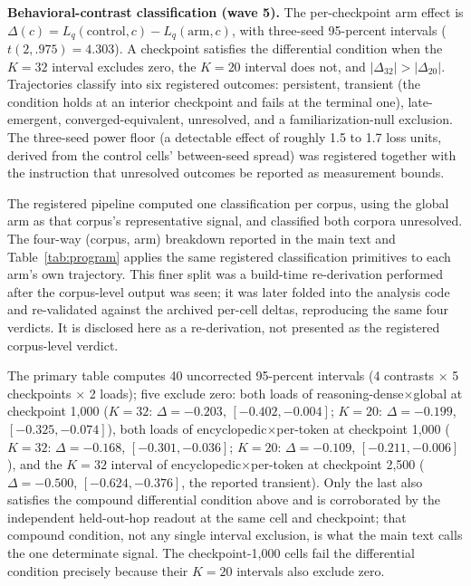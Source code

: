 \documentclass{article} %
\begin{document}
\textbf{Behavioral-contrast classification (wave 5).} The per-checkpoint
arm effect is $\Delta(c) = L_q(\text{control}, c) - L_q(\text{arm}, c)$,
with three-seed 95-percent intervals ($t(2, .975) = 4.303$). %
A checkpoint
satisfies the differential condition when the $K{=}32$ interval excludes
zero, the $K{=}20$ interval does not, and $|\Delta_{32}| > |\Delta_{20}|$.
Trajectories classify into six registered outcomes: persistent, transient
(the condition holds at an interior checkpoint and fails at the terminal
one), late-emergent, converged-equivalent, unresolved, and a
familiarization-null exclusion. The three-seed power floor (a detectable
effect of roughly 1.5 to 1.7 loss units, derived from the control cells'
between-seed spread) was registered together with the instruction that
unresolved outcomes be reported as measurement bounds. %

The registered pipeline computed one classification per corpus, using the
global arm as that corpus's representative signal, and classified both
corpora unresolved. %
The four-way (corpus, arm) breakdown reported in the
main text and Table~\ref{tab:program} applies the same registered
classification primitives to each arm's own trajectory. This finer split
was a build-time re-derivation performed after the corpus-level output was
seen; it was later folded into the analysis code and re-validated against
the archived per-cell deltas, reproducing the same four verdicts. It is
disclosed here as a re-derivation, not presented as the registered
corpus-level verdict.

The primary table computes 40 uncorrected 95-percent intervals (4
contrasts $\times$ 5 checkpoints $\times$ 2 loads); five exclude zero:
both loads of reasoning-dense$\times$global at checkpoint 1{,}000
($K{=}32$: $\Delta{=}{-}0.203$, $[-0.402,-0.004]$; $K{=}20$:
$\Delta{=}{-}0.199$, $[-0.325,-0.074]$), both loads of
encyclopedic$\times$per-token at checkpoint 1{,}000 ($K{=}32$:
$\Delta{=}{-}0.168$, $[-0.301,-0.036]$; $K{=}20$: $\Delta{=}{-}0.109$,
$[-0.211,-0.006]$), and the $K{=}32$ interval of
encyclopedic$\times$per-token at checkpoint 2{,}500 ($\Delta{=}{-}0.500$,
$[-0.624,-0.376]$, the reported transient). %
Only the last also satisfies
the compound differential condition above and is corroborated by the
independent held-out-hop readout at the same cell and checkpoint; that
compound condition, not any single interval exclusion, is what the main
text calls the one determinate signal. The checkpoint-1{,}000 cells fail
the differential condition precisely because their $K{=}20$ intervals
also exclude zero.
\end{document}
